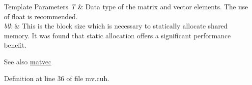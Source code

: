 \begin{DoxyTemplParams}{Template Parameters}
{\em T} & Data type of the matrix and vector elements. The use of {\ttfamily float} is recommended. \\
\hline
{\em blk} & This is the block size which is necessary to statically allocate shared memory. It was found that static allocation offers a significant performance benefit.\\
\hline
\end{DoxyTemplParams}
\begin{DoxySeeAlso}{See also}
\hyperlink{mv__api_8cuh_a988d3fef9af4a5046885005ae4f9ca72}{matvec} 
\end{DoxySeeAlso}


Definition at line 36 of file mv.\+cuh.

